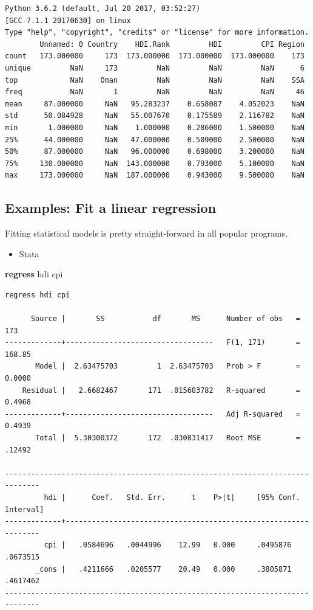 \documentclass[
]{book}
\newenvironment{Shaded}{\begin{snugshade}}{\end{snugshade}}
\newcommand{\KeywordTok}[1]{\textcolor[rgb]{0.13,0.29,0.53}{\textbf{#1}}}
\newcommand{\NormalTok}[1]{#1}
\providecommand{\tightlist}{%
  \setlength{\itemsep}{0pt}\setlength{\parskip}{0pt}}
\begin{document}
\begin{verbatim}
Python 3.6.2 (default, Jul 20 2017, 03:52:27) 
[GCC 7.1.1 20170630] on linux
Type "help", "copyright", "credits" or "license" for more information.
        Unnamed: 0 Country    HDI.Rank         HDI         CPI Region
count   173.000000     173  173.000000  173.000000  173.000000    173
unique         NaN     173         NaN         NaN         NaN      6
top            NaN    Oman         NaN         NaN         NaN    SSA
freq           NaN       1         NaN         NaN         NaN     46
mean     87.000000     NaN   95.283237    0.658087    4.052023    NaN
std      50.084928     NaN   55.007670    0.175589    2.116782    NaN
min       1.000000     NaN    1.000000    0.286000    1.500000    NaN
25%      44.000000     NaN   47.000000    0.509000    2.500000    NaN
50%      87.000000     NaN   96.000000    0.698000    3.200000    NaN
75%     130.000000     NaN  143.000000    0.793000    5.100000    NaN
max     173.000000     NaN  187.000000    0.943000    9.500000    NaN
\end{verbatim}

\hypertarget{examples-fit-a-linear-regression}{%
\subsection{Examples: Fit a linear regression}\label{examples-fit-a-linear-regression}}

Fitting statistical models is pretty straight-forward in all popular programs.

\begin{itemize}
\tightlist
\item
  Stata
\end{itemize}

\begin{Shaded}
\begin{Highlighting}[]
\KeywordTok{regress}\NormalTok{ hdi cpi}
\end{Highlighting}
\end{Shaded}

\begin{verbatim}
regress hdi cpi

      Source |       SS           df       MS      Number of obs   =       173
-------------+----------------------------------   F(1, 171)       =    168.85
       Model |  2.63475703         1  2.63475703   Prob > F        =    0.0000
    Residual |   2.6682467       171  .015603782   R-squared       =    0.4968
-------------+----------------------------------   Adj R-squared   =    0.4939
       Total |  5.30300372       172  .030831417   Root MSE        =    .12492

------------------------------------------------------------------------------
         hdi |      Coef.   Std. Err.      t    P>|t|     [95% Conf. Interval]
-------------+----------------------------------------------------------------
         cpi |   .0584696   .0044996    12.99   0.000     .0495876    .0673515
       _cons |   .4211666   .0205577    20.49   0.000     .3805871    .4617462
------------------------------------------------------------------------------
\end{verbatim}
\end{document}
